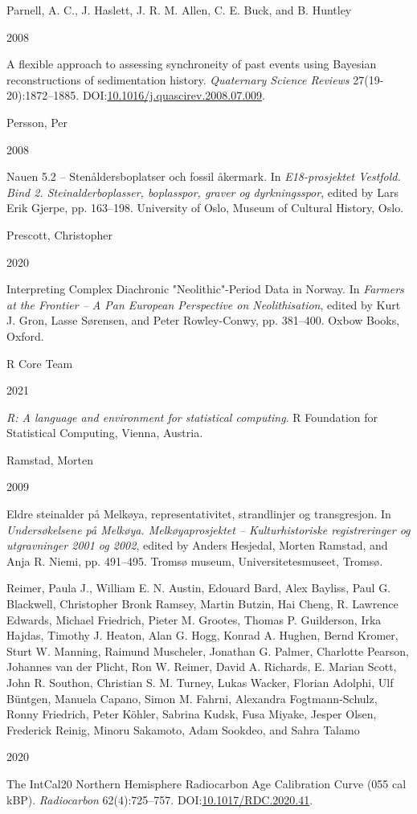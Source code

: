 \documentclass[
]{article}
\newlength{\cslhangindent}
\newlength{\csllabelwidth}
\newlength{\cslentryspacingunit} %
\newenvironment{CSLReferences}[2] %
 {%
  \setlength{\parindent}{0pt}
  \ifodd #1
  \let\oldpar\par
  \def\par{\hangindent=\cslhangindent\oldpar}
  \fi
  \setlength{\parskip}{#2\cslentryspacingunit}
 }%
 {}
\newcommand{\CSLBlock}[1]{#1\hfill\break}
\newcommand{\CSLLeftMargin}[1]{\parbox[t]{\csllabelwidth}{#1}}
\newcommand{\CSLRightInline}[1]{\parbox[t]{\linewidth - \csllabelwidth}{#1}\break}
\begin{document}
\begin{CSLReferences}{0}{0}
\leavevmode{}%
\CSLBlock{Parnell, A. C., J. Haslett, J. R. M. Allen, C. E. Buck, and B. Huntley}
\CSLLeftMargin{ 2008}
\CSLRightInline{A flexible approach to assessing synchroneity of past events using Bayesian reconstructions of sedimentation history. \emph{Quaternary Science Reviews} 27(19-20):1872--1885. DOI:\href{https://doi.org/10.1016/j.quascirev.2008.07.009}{10.1016/j.quascirev.2008.07.009}.}

\leavevmode{}%
\CSLBlock{Persson, Per}
\CSLLeftMargin{ 2008}
\CSLRightInline{{Nauen 5.2 -- Stenåldersboplatser och fossil åkermark}. In \emph{{E18-prosjektet Vestfold. Bind 2. Steinalderboplasser, boplasspor, graver og dyrkningsspor}}, edited by Lars Erik Gjerpe, pp. 163--198. University of Oslo, Museum of Cultural History, Oslo.}

\leavevmode{}%
\CSLBlock{Prescott, Christopher}
\CSLLeftMargin{ 2020}
\CSLRightInline{{Interpreting Complex Diachronic {"}Neolithic{"}-Period Data in Norway}. In \emph{{Farmers at the Frontier -- A Pan European Perspective on Neolithisation}}, edited by Kurt J. Gron, Lasse Sørensen, and Peter Rowley-Conwy, pp. 381--400. Oxbow Books, Oxford.}

\leavevmode{}%
\CSLBlock{R Core Team}
\CSLLeftMargin{ 2021}
\CSLRightInline{\emph{R: A language and environment for statistical computing}. R Foundation for Statistical Computing, Vienna, Austria.}

\leavevmode{}%
\CSLBlock{Ramstad, Morten}
\CSLLeftMargin{ 2009}
\CSLRightInline{{Eldre steinalder på Melkøya, representativitet, strandlinjer og transgresjon}. In \emph{{Undersøkelsene på Melkøya. Melkøyaprosjektet -- Kulturhistoriske registreringer og utgravninger 2001 og 2002}}, edited by Anders Hesjedal, Morten Ramstad, and Anja R. Niemi, pp. 491--495. Tromsø museum, Universitetesmuseet, Tromsø.}

\leavevmode{}%
\CSLBlock{Reimer, Paula J., William E. N. Austin, Edouard Bard, Alex Bayliss, Paul G. Blackwell, Christopher Bronk Ramsey, Martin Butzin, Hai Cheng, R. Lawrence Edwards, Michael Friedrich, Pieter M. Grootes, Thomas P. Guilderson, Irka Hajdas, Timothy J. Heaton, Alan G. Hogg, Konrad A. Hughen, Bernd Kromer, Sturt W. Manning, Raimund Muscheler, Jonathan G. Palmer, Charlotte Pearson, Johannes van der Plicht, Ron W. Reimer, David A. Richards, E. Marian Scott, John R. Southon, Christian S. M. Turney, Lukas Wacker, Florian Adolphi, Ulf Büntgen, Manuela Capano, Simon M. Fahrni, Alexandra Fogtmann-Schulz, Ronny Friedrich, Peter Köhler, Sabrina Kudsk, Fusa Miyake, Jesper Olsen, Frederick Reinig, Minoru Sakamoto, Adam Sookdeo, and Sahra Talamo}
\CSLLeftMargin{ 2020}
\CSLRightInline{The IntCal20 Northern Hemisphere Radiocarbon Age Calibration Curve (0{\textendash}55 cal kBP). \emph{Radiocarbon} 62(4):725--757. DOI:\href{https://doi.org/10.1017/RDC.2020.41}{10.1017/RDC.2020.41}.}


\end{CSLReferences}
\end{document}
